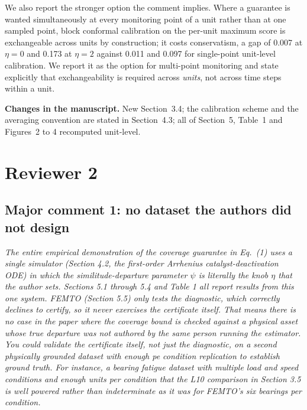 \documentclass[11pt,a4paper]{article}
\newenvironment{comment}
  {\begin{list}{}{\leftmargin=6mm \rightmargin=2mm}\item[]\color{quoteline}\itshape}
  {\end{list}}
\newcommand{\where}[1]{\textbf{Changes in the manuscript.} #1}
\begin{document}
We also report the stronger option the comment implies. Where a guarantee is wanted simultaneously
at every monitoring point of a unit rather than at one sampled point, block conformal calibration on
the per-unit maximum score is exchangeable across units by construction; it costs conservatism, a
gap of 0.007 at $\eta=0$ and 0.173 at $\eta=2$ against 0.011 and 0.097 for single-point unit-level
calibration. We report it as the option for multi-point monitoring and state explicitly that
exchangeability is required across \emph{units}, not across time steps within a unit.

\where{New Section~3.4; the calibration scheme and the averaging convention are stated in
Section~4.3; all of Section~5, Table~1 and Figures~2 to 4 recomputed unit-level.}

\clearpage
\section*{Reviewer 2}

\subsection*{Major comment 1: no dataset the authors did not design}
\begin{comment}
The entire empirical demonstration of the coverage guarantee in Eq.~(1) uses a single simulator
(Section 4.2, the first-order Arrhenius catalyst-deactivation ODE) in which the similitude-departure
parameter $\psi$ is literally the knob $\eta$ that the author sets. Sections 5.1 through 5.4 and
Table 1 all report results from this one system. FEMTO (Section 5.5) only tests the diagnostic,
which correctly declines to certify, so it never exercises the certificate itself. That means there
is no case in the paper where the coverage bound is checked against a physical asset whose true
departure was not authored by the same person running the estimator. You could validate the
certificate itself, not just the diagnostic, on a second physically grounded dataset with enough pe
condition replication to establish ground truth. For instance, a bearing fatigue dataset with
multiple load and speed conditions and enough units per condition that the L10 comparison in
Section 3.5 is well powered rather than indeterminate as it was for FEMTO's six bearings per
condition.
\end{comment}
\end{document}
